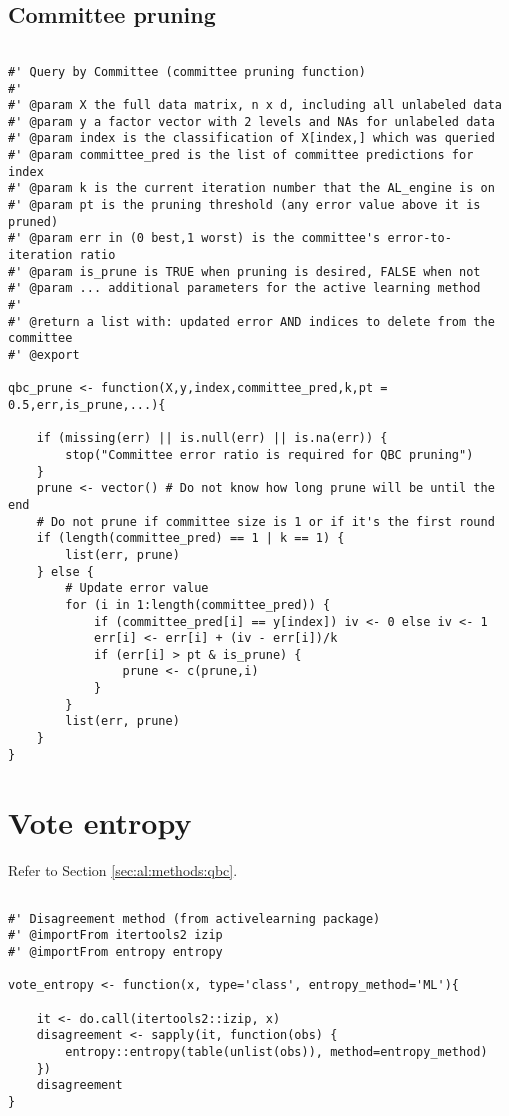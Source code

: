 


\subsection{Committee pruning}
{
\begin{lstlisting}

#' Query by Committee (committee pruning function)
#'
#' @param X the full data matrix, n x d, including all unlabeled data
#' @param y a factor vector with 2 levels and NAs for unlabeled data
#' @param index is the classification of X[index,] which was queried
#' @param committee_pred is the list of committee predictions for index
#' @param k is the current iteration number that the AL_engine is on
#' @param pt is the pruning threshold (any error value above it is pruned)
#' @param err in (0 best,1 worst) is the committee's error-to-iteration ratio
#' @param is_prune is TRUE when pruning is desired, FALSE when not
#' @param ... additional parameters for the active learning method
#'
#' @return a list with: updated error AND indices to delete from the committee
#' @export

qbc_prune <- function(X,y,index,committee_pred,k,pt = 0.5,err,is_prune,...){

	if (missing(err) || is.null(err) || is.na(err)) {
		stop("Committee error ratio is required for QBC pruning")
	}
	prune <- vector() # Do not know how long prune will be until the end
	# Do not prune if committee size is 1 or if it's the first round
	if (length(committee_pred) == 1 | k == 1) {
		list(err, prune)
	} else {
		# Update error value
		for (i in 1:length(committee_pred)) {
			if (committee_pred[i] == y[index]) iv <- 0 else iv <- 1
			err[i] <- err[i] + (iv - err[i])/k
			if (err[i] > pt & is_prune) {
				prune <- c(prune,i)
			}
		}
		list(err, prune)
	}
}
\end{lstlisting}
}

\section{Vote entropy}
\label{sec:appendicies:al:entropy}

Refer to Section \ref{sec:al:methods:qbc}.
{
\begin{lstlisting}

#' Disagreement method (from activelearning package)
#' @importFrom itertools2 izip
#' @importFrom entropy entropy

vote_entropy <- function(x, type='class', entropy_method='ML'){

	it <- do.call(itertools2::izip, x)
	disagreement <- sapply(it, function(obs) {
		entropy::entropy(table(unlist(obs)), method=entropy_method)
	})
	disagreement
}
\end{lstlisting}
}



